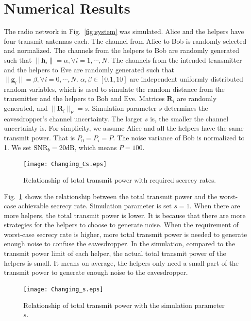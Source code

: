 \documentclass[journal]{IEEEtran}
\begin{document}
\section{Numerical Results} \label{sec:numerical results}
The radio network in Fig.~\ref{fig:system} was simulated. Alice and the helpers have four transmit antennas each. The channel from Alice to Bob is randomly selected and normalized. The channels from the helpers to Bob are randomly generated such that $\|\mathbf{h}_i\| = \alpha,  \forall i = 1,\cdots,N$. The channels from the intended transmitter and the helpers to Eve are randomly generated  such that $\|\bar{\mathbf{g}}_i\| = \beta,\forall i = 0, \cdots,N$. $\alpha,\beta\in  [0.1,10]$ are independent uniformly distributed random variables, which is used to simulate the random distance from the transmitter and the helpers to Bob and Eve. 
Matrices $\mathbf{R}_i$ are randomly generated, and $\|\mathbf{R}_i\|_F = s$. Simulation parameter $s$ determines the eavesdropper's channel uncertainty. The larger $s$ is, the smaller the channel uncertainty is. 
For simplicity, we assume Alice and all the helpers have the same transmit power. That is $P_0=P_i = P$. 
The noise variance of Bob is normalized to 1. We set $\mathrm{SNR}_b = 20 \mathrm{dB}$, which means $P = 100$.


\begin{figure}[!ht]
	\centering
	\texttt{[image: Changing\_Cs.eps]} %
	\caption{Relationship of total transmit power with required secrecy rates.}
	\label{fig:Changing_Cs}
\end{figure}

Fig.~\ref{fig:Changing_Cs} shows the relationship between the total transmit power and the worst-case achievable secrecy rate. Simulation parameter is set $s = 1$. When there are more helpers, the total transmit power is lower. It is because that there are more strategies for the helpers to choose to generate noise. When the requirement of worst-case secrecy rate is higher, more total transmit power is needed to generate enough noise to confuse the eavesdropper. In the simulation, compared to the transmit power limit of each helper, the actual total transmit power of the helpers is small. It means on average, the helpers only need a small part of the transmit power to generate enough noise to the eavesdropper.

\begin{figure}[!ht]
	\centering
	\texttt{[image: Changing\_s.eps]} %
	\caption{Relationship of total transmit power with the simulation parameter $s$.}
	\label{fig:Changing_s}
\end{figure}
\end{document}
